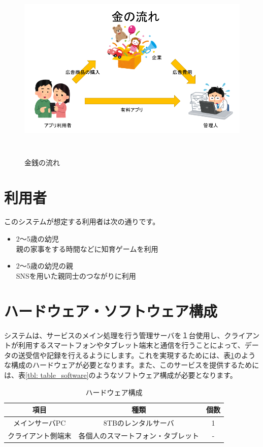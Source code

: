 \documentclass[a4j]{jarticle}
\begin{document}
\begin{figure}[h]
  \begin{center}
    \includegraphics[width = 14cm, height = 9cm]{section5_money.png}
    \caption{金銭の流れ}
    \label{money}
  \end{center}
\end{figure}

\section{利用者}
このシステムが想定する利用者は次の通りです。

\begin{itemize}
\item 2～5歳の幼児\\
  親の家事をする時間などに知育ゲームを利用
\item 2～5歳の幼児の親\\
  SNSを用いた親同士のつながりに利用
\end{itemize}

\section{ハードウェア・ソフトウェア構成}
システムは、サービスのメイン処理を行う管理サーバを１台使用し、クライアントが利用するスマートフォンやタブレット端末と通信を行うことによって、データの送受信や記録を行えるようにします。これを実現するためには、表\ref{tbl: table_hardware}のような構成のハードウェアが必要となります。また、このサービスを提供するためには、表\ref{tbl: table_software}のようなソフトウェア構成が必要となります。

\begin{table}[H]
    \caption{ハードウェア構成}
    \label{tbl: table_hardware}
    \begin{center}
        \begin{tabular}{|c|c|c|} \hline
            項目 & 種類　&  個数\\ \hline
            メインサーバPC & 8TBのレンタルサーバ & 1\\ \hline
            クライアント側端末 & 各個人のスマートフォン・タブレット  & - \\ \hline
        \end{tabular}
    \end{center}
\end{table}
\end{document}
